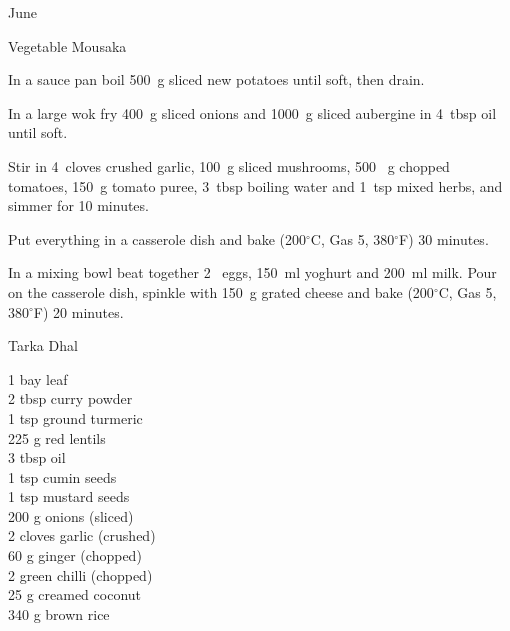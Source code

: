 \begin{menu}{June}
\begin{recipe}{2}{Vegetable Mousaka}
    \begin{instructions}
    \item 
        In a sauce pan boil
        500~g sliced new potatoes
        until soft,
        then drain.
      \item 
        In a large wok fry
        400~g sliced onions
        and
        1000~g sliced aubergine
        in
        4~tbsp  oil
        until soft.
      \item 
        Stir in
        4~cloves crushed garlic,
        100~g sliced mushrooms,
        500 ~g chopped tomatoes,
        150~g  tomato puree,
        3~tbsp  boiling water
        and
        1~tsp  mixed herbs,
        and simmer for 10 minutes.
      \item 
        Put everything in a casserole dish
        and bake (200$^{\circ}$C, Gas 5, 380$^{\circ}$F) 30 minutes.
      \item 
        In a mixing bowl beat together
        2~  eggs,
        150~ml  yoghurt
        and
        200~ml  milk.
        Pour on the casserole dish, spinkle with
        150~g grated cheese
        and bake (200$^{\circ}$C, Gas 5, 380$^{\circ}$F) 20 minutes.
      
    \end{instructions}
    \end{recipe}%
  
    \begin{recipe}{2}{Tarka Dhal}%
		\begin{ingredients}
		1  bay leaf  \\
	2 tbsp curry powder  \\
	1 tsp ground turmeric  \\
	225 g red lentils  \\
	3 tbsp oil  \\
	1 tsp cumin seeds  \\
	1 tsp mustard seeds  \\
	200 g onions (sliced) \\
	2 cloves garlic (crushed) \\
	60 g ginger (chopped) \\
	2  green chilli (chopped) \\
	25 g creamed coconut  \\
	340 g brown rice  \\
	
		\end{ingredients}
	
	

\end{recipe}
\end{menu}
